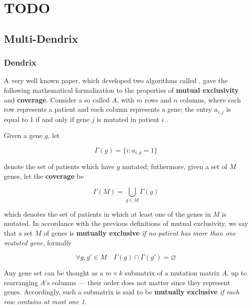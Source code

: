 
\chapter{TODO} \label{chap:TODO}

\section{Multi-Dendrix}

\subsection{Dendrix}

A very well known paper, which developed two algorithms called  \cite{dendrix}, gave the following mathematical formalization to the properties of \textbf{mutual exclusivity} and \textbf{coverage}. Consider a so called  $A$, with $m$ rows and $n$ columns, where each row represents a patient and each column represents a gene; the entry $a_{i, j}$ is equal to 1 if and only if gene $j$ is mutated in patient $i$ .



Given a gene $g$, let

\begin{equation}
    \Gamma(g) = \{i : a_{i, g} = 1\}
\end{equation}

denote the set of patients which have $g$ mutated; futhermore, given a set of $M$ genes, let the \textbf{coverage} be

\begin{equation}
    \Gamma(M) = \bigcup_{g \in M}{\Gamma(g)}
\end{equation}

which denotes the set of patients in which at least one of the genes in $M$ is mutated. In accordance with the previous definitions of mutual exclusivity, we say that a set $M$ of genes is \textbf{mutually exclusive} \textit{if no patient has more than one mutated gene}, formally

\begin{equation}
    \forall g, g' \in M \quad \Gamma(g) \cap \Gamma(g') = \varnothing
\end{equation}

Any gene set can be thought as a $m \times k$ submatrix of a mutation matrix $A$, up to rearranging $A$'s columns --- their order does not matter since they represent genes. Accordingly, such a submatrix is said to be \textbf{mutually exclusive} \textit{if each row contains at most one 1}.

